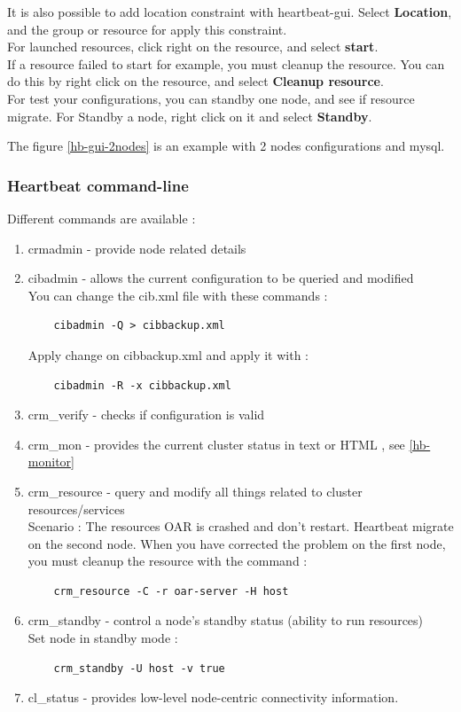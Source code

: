 \documentclass[a4paper,10pt]{report}
\begin{document}
It is also possible to add location constraint with heartbeat-gui. Select \textbf{Location}, and the group or resource for apply this constraint.\\

For launched resources, click right on the resource, and select \textbf{start}.\\

If a resource failed to start for example, you must cleanup the resource. You can do this by right click on the resource, and select \textbf{Cleanup resource}.\\

For test your configurations, you can standby one node, and see if resource migrate. For Standby a node, right click on it and select \textbf{Standby}.

The figure \ref{hb-gui-2nodes} is an example with 2 nodes configurations and mysql.

\subsubsection{Heartbeat command-line}
\label{hb-command}
Different commands are available : 
\begin{enumerate}
 \item crmadmin - provide node related details 
 \item cibadmin - allows the current configuration to be queried and modified \\
    You can change the cib.xml file with these commands :
    \begin{lstlisting}
    cibadmin -Q > cibbackup.xml 
    \end{lstlisting}
  Apply change on cibbackup.xml and apply it with :
    \begin{lstlisting}
    cibadmin -R -x cibbackup.xml 
    \end{lstlisting}

 \item crm\_verify - checks if configuration is valid 
 \item crm\_mon - provides the current cluster status in text or HTML , see \ref{hb-monitor}
 \item crm\_resource - query and modify all things related to cluster resources/services\\
    Scenario : The resources OAR is crashed and don't restart. Heartbeat migrate on the second node. When you have corrected the problem on the first node, you must cleanup the resource with the command :
    \begin{lstlisting}
    crm_resource -C -r oar-server -H host
    \end{lstlisting}
 \item crm\_standby - control a node's standby status (ability to run resources) \\
    Set node in standby mode :
    \begin{lstlisting}
    crm_standby -U host -v true 
    \end{lstlisting}
 \item cl\_status - provides low-level node-centric connectivity information. 
\end{enumerate}
\end{document}
